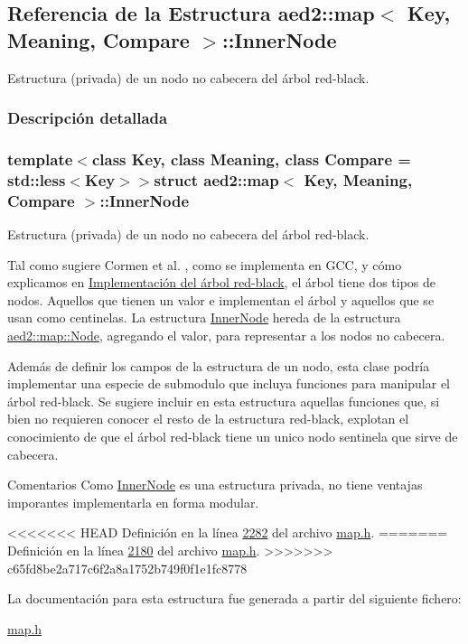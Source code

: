 \hypertarget{structaed2_1_1map_1_1InnerNode}{\subsection{\-Referencia de la \-Estructura aed2\-:\-:map$<$ \-Key, \-Meaning, \-Compare $>$\-:\-:\-Inner\-Node}
\label{structaed2_1_1map_1_1InnerNode}
}


\-Estructura (privada) de un nodo no cabecera del árbol red-\/black.  




\subsubsection{\-Descripción detallada}
\subsubsection*{template$<$class \-Key, class \-Meaning, class \-Compare = std\-::less$<$\-Key$>$$>$struct aed2\-::map$<$ Key, Meaning, Compare $>$\-::\-Inner\-Node}

\-Estructura (privada) de un nodo no cabecera del árbol red-\/black. 

\-Tal como sugiere \-Cormen et al. \cite{CormenLeisersonRivestStein2009}, como se implementa en \-G\-C\-C, y cómo explicamos en \hyperlink{Implementacion}{\-Implementación del árbol red-\/black}, el árbol tiene dos tipos de nodos. \-Aquellos que tienen un valor e implementan el árbol y aquellos que se usan como centinelas. \-La estructura \hyperlink{structaed2_1_1map_1_1InnerNode}{\-Inner\-Node} hereda de la estructura \hyperlink{structaed2_1_1map_1_1Node}{aed2\-::map\-::\-Node}, agregando el valor, para representar a los nodos no cabecera.

\-Además de definir los campos de la estructura de un nodo, esta clase podría implementar una especie de submodulo que incluya funciones para manipular el árbol red-\/black. \-Se sugiere incluir en esta estructura aquellas funciones que, si bien no requieren conocer el resto de la estructura red-\/black, explotan el conocimiento de que el árbol red-\/black tiene un unico nodo sentinela que sirve de cabecera.

\begin{DoxyRemark}{\-Comentarios}
\-Como \hyperlink{structaed2_1_1map_1_1InnerNode}{\-Inner\-Node} es una estructura privada, no tiene ventajas imporantes implementarla en forma modular. 
\end{DoxyRemark}


<<<<<<< HEAD
\-Definición en la línea \hyperlink{map_8h_source_l02282}{2282} del archivo \hyperlink{map_8h_source}{map.\-h}.
=======
Definición en la línea \hyperlink{map_8h_source_l02180}{2180} del archivo \hyperlink{map_8h_source}{map.\+h}.
>>>>>>> c65fd8be2a717c6f2a8a1752b749f0f1e1fc8778



\-La documentación para esta estructura fue generada a partir del siguiente fichero\-:\begin{DoxyCompactItemize}
\item 
\hyperlink{map_8h}{map.\-h}\end{DoxyCompactItemize}
